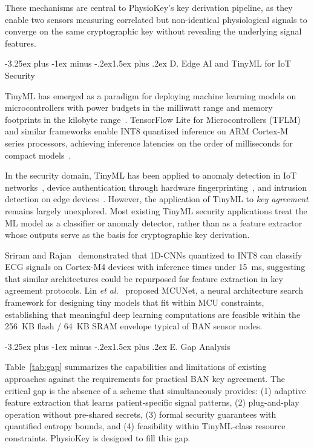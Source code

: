 \documentclass[10pt,twocolumn]{article}
\makeatletter
\renewcommand{\subsection}{\@startsection{subsection}{2}{\z@}%
  {-3.25ex plus -1ex minus -.2ex}{1.5ex plus .2ex}%
  {\normalfont\normalsize\bfseries\itshape}}
\newcommand{\etal}{\textit{et al.}}
\makeatother
\begin{document}
These mechanisms are central to PhysioKey's key derivation pipeline, as they enable two sensors measuring correlated but non-identical physiological signals to converge on the same cryptographic key without revealing the underlying signal features.

\subsection{D. Edge AI and TinyML for IoT Security}
\label{subsec:tinyml}

TinyML has emerged as a paradigm for deploying machine learning models on microcontrollers with power budgets in the milliwatt range and memory footprints in the kilobyte range~\cite{warden2019tinyml, banbury2021mlperf}. TensorFlow Lite for Microcontrollers (TFLM) and similar frameworks enable INT8 quantized inference on ARM Cortex-M series processors, achieving inference latencies on the order of milliseconds for compact models~\cite{david2021tensorflow}.

In the security domain, TinyML has been applied to anomaly detection in IoT networks~\cite{antonini2023tiny}, device authentication through hardware fingerprinting~\cite{chatterjee2019rf}, and intrusion detection on edge devices~\cite{alhanahnah2023tinyml}. However, the application of TinyML to \textit{key agreement} remains largely unexplored. Most existing TinyML security applications treat the ML model as a classifier or anomaly detector, rather than as a feature extractor whose outputs serve as the basis for cryptographic key derivation.

Sriram and Rajan~\cite{sriram2022tinyml} demonstrated that 1D-CNNs quantized to INT8 can classify ECG signals on Cortex-M4 devices with inference times under 15~ms, suggesting that similar architectures could be repurposed for feature extraction in key agreement protocols. Lin \etal~\cite{lin2020mcunet} proposed MCUNet, a neural architecture search framework for designing tiny models that fit within MCU constraints, establishing that meaningful deep learning computations are feasible within the 256~KB flash / 64~KB SRAM envelope typical of BAN sensor nodes.

\subsection{E. Gap Analysis}
\label{subsec:gap}

Table~\ref{tab:gap} summarizes the capabilities and limitations of existing approaches against the requirements for practical BAN key agreement. The critical gap is the absence of a scheme that simultaneously provides: (1) adaptive feature extraction that learns patient-specific signal patterns, (2) plug-and-play operation without pre-shared secrets, (3) formal security guarantees with quantified entropy bounds, and (4) feasibility within TinyML-class resource constraints. PhysioKey is designed to fill this gap.
\end{document}
